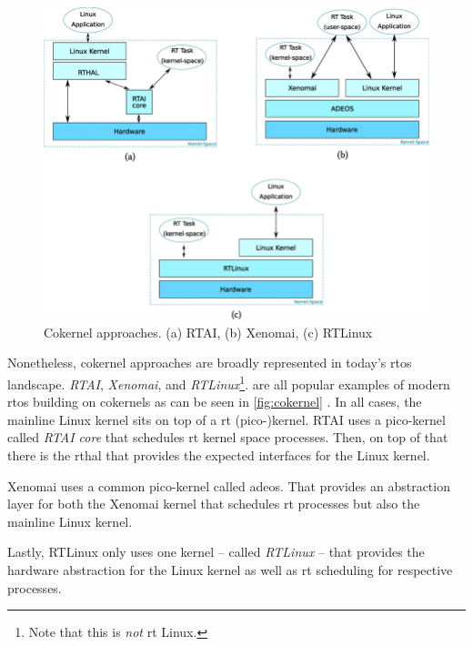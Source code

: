 \documentclass[10pt,twocolumn,a4paper]{article}
\begin{document}
\begin{figure}[hbt]
  \centering
  \includegraphics[scale=.30, clip]{assets/cokernel.png}
  \caption{Cokernel approaches. (a) RTAI, (b) Xenomai, (c) RTLinux \cite{reghenzani_realtime_2019} \label{fig:cokernel}}
\end{figure}
Nonetheless, cokernel approaches are broadly represented in today's \acrshort{rtos} landscape.
\emph{RTAI}\cite{rtai-docs}, \emph{Xenomai}\cite{xenomai-docs}, and \emph{RTLinux}\footnote{Note that this is \emph{not} \acrlong{rt} Linux.}\cite{rtlinux}. are all popular examples of modern \acrshort{rtos} building on cokernels as can be seen in \autoref{fig:cokernel} \cite{reghenzani_realtime_2019}.
In all cases, the mainline Linux kernel sits on top of a \acrshort{rt} (pico-)kernel.
RTAI uses a pico-kernel called \emph{RTAI core} that schedules \acrshort{rt} kernel space processes.
Then, on top of that there is the \acrfull{rthal} that provides the expected interfaces for the Linux kernel.

Xenomai uses a common pico-kernel called \acrfull{adeos}.
That provides an abstraction layer for both the Xenomai kernel that schedules \acrshort{rt} processes but also the mainline Linux kernel.

Lastly, RTLinux only uses one kernel -- called \emph{RTLinux} -- that provides the hardware abstraction for the Linux kernel as well as \acrshort{rt} scheduling for respective processes.
\newline
\end{document}
